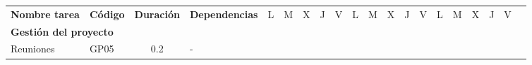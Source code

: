 \begin{table}[H]
\begin{tabular}{|llcllllllllllllllll|l}
        \multicolumn{1}{|c|}{\multirow{-2}{*}{\textbf{Nombre tarea}}}                                          & \multicolumn{1}{c|}{\multirow{-2}{*}{\textbf{Código}}} & \multicolumn{1}{c|}{\multirow{-2}{*}{\textbf{Duración}}} & \multicolumn{1}{c|}{\multirow{-2}{*}{\textbf{Dependencias}}}            & \multicolumn{1}{l|}{L}          & \multicolumn{1}{l|}{M}          & \multicolumn{1}{l|}{X}          & \multicolumn{1}{l|}{J}          & \multicolumn{1}{l|}{V}          & \multicolumn{1}{l|}{L}          & \multicolumn{1}{l|}{M}          & \multicolumn{1}{l|}{X}          & \multicolumn{1}{l|}{J}          & \multicolumn{1}{l|}{V}          & \multicolumn{1}{l|}{L}          & \multicolumn{1}{l|}{M}          & \multicolumn{1}{l|}{X}          & \multicolumn{1}{l|}{J}          & V                        &  \\ \cline{1-19}
        \multicolumn{4}{|l|}{\textbf{Gestión del proyecto}}                                                                                                                                                                                                                                                  & \multicolumn{15}{l|}{}                                                                                                                                                                                                                                                                                                                                                                                                                                                                                               &  \\ \cline{1-19}
        \multicolumn{1}{|l|}{Reuniones}                                                                        & \multicolumn{1}{l|}{GP05}                              & \multicolumn{1}{c|}{0.2}                                 & \multicolumn{1}{l|}{-}                                                  &                                 &                                 &                                 &                                 &                                 &                                 &                                 &                                 & \cellcolor[HTML]{EF8787}        &                                 &                                 &                                 &                                 &                                 &                          &  \\ \cline{1-4}

\end{tabular}
\end{table}
